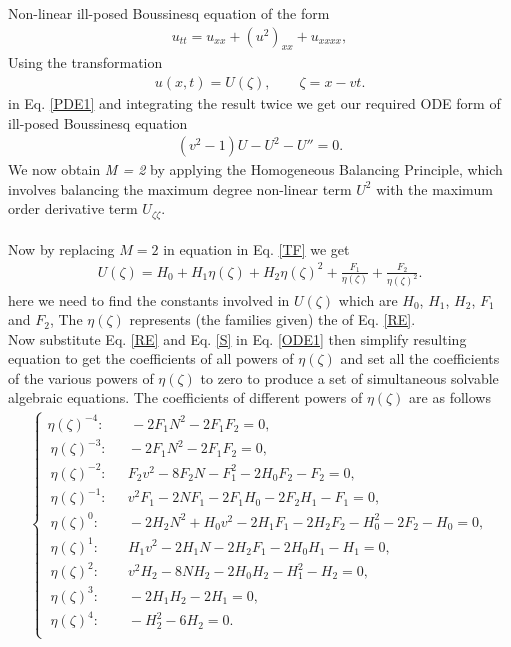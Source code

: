 \documentclass[10pt]{NSP1}
\numberwithin{equation}{section}
\begin{document}
Non-linear ill-posed Boussinesq equation of the form
\begin{eqnarray}\label{PDE1}
u_{\mathit{tt}} =u_{\mathit{xx}}+\left(u^{2}\right)_{\mathit{xx}}+u_{\mathit{xxxx}},
\end{eqnarray}
Using the transformation
\begin{eqnarray}\label{TF1}
u(x,t)=U(\zeta), \qquad \zeta=x - v t.
\end{eqnarray}
in Eq. \ref{PDE1} and integrating the result twice we get our required ODE form of ill-posed Boussinesq equation
\begin{eqnarray}\label{ODE1}
\left(v^{2}-1\right) U -U^{2}-U'' = 0.
\end{eqnarray}
We now obtain \emph{M = 2} by applying the Homogeneous Balancing Principle, which involves balancing the maximum degree non-linear term $U^{2}$ with the maximum order derivative term $U_{\zeta \zeta}$.\\\\
Now by replacing $M=2$ in equation in Eq. \ref{TF} we get
\begin{eqnarray}\label{S}
U  \left(\zeta \right) =H_{0}+H_{1} \eta  \left(\zeta \right)+H_{2} \eta  \left(\zeta \right)^{2}+\frac{F_{1}}{\eta \! \left(\zeta \right)}+\frac{F_{2}}{\eta  \left(\zeta \right)^{2}}.
\end{eqnarray}
here we need to find the constants involved in $U{(\zeta)}$ which are $H_{0}$, $H_{1}$, $H_{2}$, $F_{1}$ and $F_{2}$,
The $\eta{(\zeta)}$ represents (the families given) the  of Eq. \ref{RE}.\\
Now substitute Eq. \ref{RE} and Eq. \ref{S} in Eq. \ref{ODE1} then simplify resulting equation to get the coefficients of all powers of ${\eta(\zeta)}$ and set all the coefficients of the various powers of $\eta{(\zeta)}$ to zero to produce a set of simultaneous solvable algebraic equations.
The coefficients of different powers of $\eta{(\zeta)}$ are as follows\\
\begin{align}
\begin{cases}
\eta{(\zeta)}^{-4} :\;\;\;\quad -2 F_{1} N^{2}-2 F_{1} F_{2}=0, \\\
\eta{(\zeta)}^{-3} :\;\,\quad -2 F_{1} N^{2}-2 F_{1} F_{2}=0, \\\
\eta{(\zeta)}^{-2} :\;\,\quad F_{2} v^{2}-8 F_{2} N -F_{1}^{2}-2 H_{0} F_{2}-F_{2}=0,\\\
\eta{(\zeta)}^{-1} :\,\;\quad v^{2} F_{1}-2 N F_{1}-2 F_{1} H_{0}-2 F_{2} H_{1}-F_{1}=0, \\\
\eta{(\zeta)}^{0}  :\qquad -2 H_{2} N^{2}+H_{0} v^{2}-2 H_{1} F_{1}-2 H_{2} F_{2}-H_{0}^{2}-2 F_{2}-H_{0}=0,\\\
\eta{(\zeta)}^{1}  :\qquad H_{1} v^{2}-2 H_{1} N -2 H_{2} F_{1}-2 H_{0} H_{1}-H_{1}=0, \\\
\eta{(\zeta)}^{2}  :\qquad v^{2} H_{2}-8 N H_{2}-2 H_{0} H_{2}-H_{1}^{2}-H_{2}=0, \\\
\eta{(\zeta)}^{3}  :\qquad-2 H_{1} H_{2}-2 H_{1}=0, \\\
\eta{(\zeta)}^{4}  :\qquad-H_{2}^{2}-6 H_{2}=0.\\
\end{cases}
\end{align}
\end{document}
